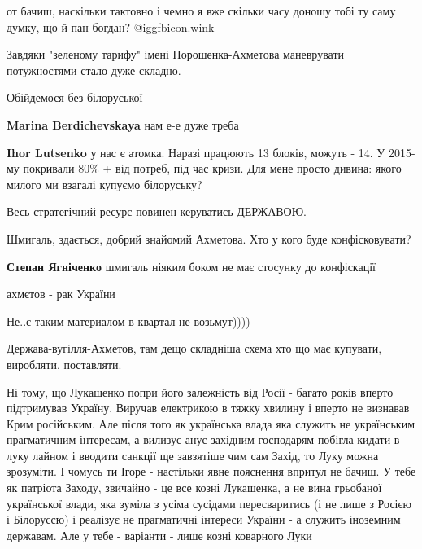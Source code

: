 \begin{itemize}
\begin{itemize}
от бачиш, наскільки тактовно і чемно я вже скільки часу доношу тобі ту саму
думку, що й пан богдан?  @igg{fbicon.wink} 

\end{itemize} %

Завдяки "зеленому тарифу" імені Порошенка-Ахметова маневрувати потужностями стало дуже складно.

Обійдемося без білоруської

\begin{itemize} %
\textbf{Marina Berdichevskaya} нам е-е дуже треба

\textbf{Ihor Lutsenko} у нас є атомка. Наразі працюють 13 блоків, можуть - 14. У 2015-му покривали 80\% + від потреб, під час кризи. Для мене просто дивина: якого милого ми взагалі купуємо білоруську?
\end{itemize} %

Весь стратегічний ресурс повинен керуватись ДЕРЖАВОЮ.

Шмигаль, здається, добрий знайомий Ахметова. Хто у кого буде конфісковувати?

\begin{itemize} %
\textbf{Степан Ягніченко} шмигаль ніяким боком не має стосунку до конфіскації
\end{itemize} %

ахмєтов - рак України

Не..с таким материалом в квартал не возьмут))))

Держава-вугілля-Ахметов, там дещо складніша схема хто що має купувати, виробляти, поставляти.


Ні тому, що Лукашенко попри його залежність від Росії - багато років вперто
підтримував Україну. Виручав електрикою в тяжку хвилину і вперто не визнавав
Крим російським. Але після того як українська влада яка служить не українським
прагматичним інтересам, а вилизує анус західним господарям побігла кидати в
луку лайном і вводити санкції ще завзятіше чим сам Захід, то Луку можна
зрозуміти. І чомусь ти Ігоре - настільки явне пояснення впритул не бачиш. У
тебе як патріота Заходу, звичайно - це все козні Лукашенка, а не вина грьобаної
української влади, яка зуміла з усіма сусідами пересваритись (і не лише з
Росією і Білоруссю) і реалізує не прагматичні інтереси України - а служить
іноземним державам. Але у тебе - варіанти - лише козні коварного Луки

\end{itemize} %
